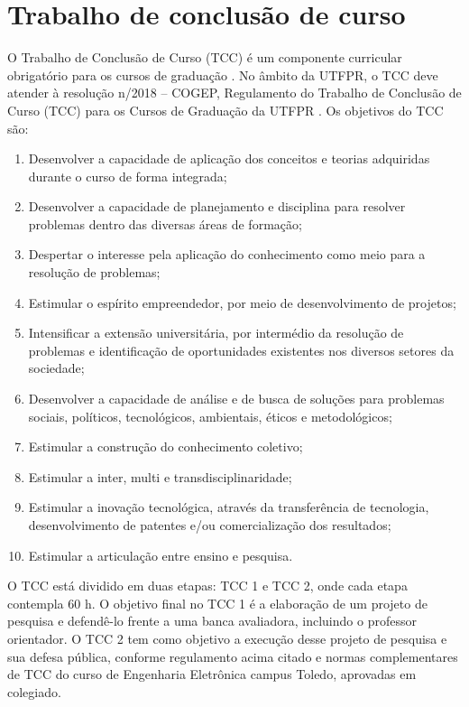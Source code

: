 
\section{Trabalho de conclusão de curso}

O Trabalho de Conclusão de Curso (TCC) é um componente curricular obrigatório para os cursos de graduação \cite{dcneng}. No âmbito da UTFPR, o TCC deve atender à resolução n/2018 – COGEP, Regulamento do Trabalho de Conclusão de Curso (TCC) para os Cursos de Graduação da UTFPR \cite{cogep18}. Os objetivos do TCC são:

\begin{enumerate}
	\item Desenvolver a capacidade de aplicação dos conceitos e teorias adquiridas durante o curso de forma integrada;
	\item Desenvolver a capacidade de planejamento e disciplina para resolver problemas dentro das diversas áreas de formação;
	\item Despertar o interesse pela aplicação do conhecimento como meio para a resolução de problemas;
	\item Estimular o espírito empreendedor, por meio de desenvolvimento de projetos;
	\item Intensificar a extensão universitária, por intermédio da resolução de problemas e identificação de oportunidades existentes nos diversos setores da sociedade;
	\item Desenvolver a capacidade de análise e de busca de soluções para problemas sociais, políticos, tecnológicos, ambientais, éticos e metodológicos;
	\item Estimular a construção do conhecimento coletivo; 
	\item Estimular a inter, multi e transdisciplinaridade;
	\item Estimular a inovação tecnológica, através da transferência de tecnologia, desenvolvimento de patentes e/ou comercialização dos resultados;
	\item Estimular a articulação entre ensino e pesquisa.  
		
\end{enumerate}

O TCC está dividido em duas etapas: TCC 1 e TCC 2, onde cada etapa contempla 60 h. O objetivo final no TCC 1 é a elaboração de um projeto de pesquisa e defendê-lo frente a uma banca avaliadora, incluindo o professor orientador. O TCC 2 tem como objetivo a execução desse projeto de pesquisa e sua defesa pública, conforme regulamento acima citado e normas complementares de TCC do curso de Engenharia Eletrônica campus Toledo, aprovadas em colegiado.

